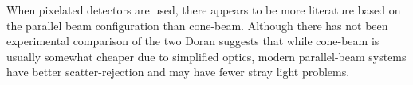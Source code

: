 \documentclass[12pt]{article}
\begin{document}
When pixelated detectors are used, there appears to be more literature based on the parallel beam configuration than cone-beam. Although there has not been experimental comparison of the two Doran suggests that while cone-beam is usually somewhat cheaper due to simplified optics, modern parallel-beam systems have better scatter-rejection and may have fewer stray light problems. \cite{Doran:2008kh, Olding:2011eta, Thomas:2011eja}



 

 






 


\end{document}
